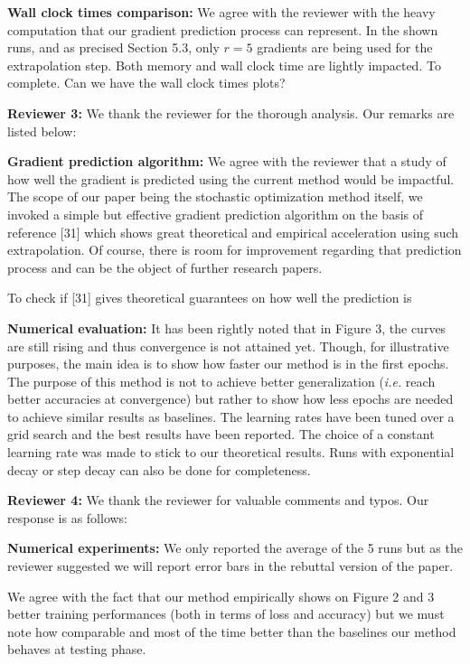 \documentclass{article}
\begin{document}
\textbf{Wall clock times comparison:}
We agree with the reviewer with the heavy computation that our gradient prediction process can represent.
In the shown runs, and as precised Section 5.3, only $r=5$ gradients are being used for the extrapolation step.
Both memory and wall clock time are lightly impacted.
{\color{red}  To complete. Can we have the wall clock times plots?}


\textbf{\textcolor{green!50!black}{Reviewer 3:}} We thank the reviewer for the thorough analysis. Our remarks are listed below:

\textbf{Gradient prediction algorithm:}
We agree with the reviewer that a study of how well the gradient is predicted using the current method would be impactful.
The scope of our paper being the stochastic optimization method itself, we invoked a simple but effective gradient prediction algorithm on the basis of reference [31] which shows great theoretical and empirical acceleration using such extrapolation.
Of course, there is room for improvement regarding that prediction process and can be the object of further research papers.

{\color{red}  To check if [31] gives theoretical guarantees on how well the prediction is}

\textbf{Numerical evaluation:} It has been rightly noted that in Figure 3, the curves are still rising and thus convergence is not attained yet.
Though, for illustrative purposes, the main idea is to show how faster our method is in the first epochs.
The purpose of this method is not to achieve better generalization (\textit{i.e.} reach better accuracies at convergence) but rather to show how less epochs are needed to achieve similar results as baselines.
The learning rates have been tuned over a grid search and the best results have been reported. The choice of a constant learning rate was made to stick to our theoretical results.
Runs with exponential decay or step decay can also be done for completeness.


\textbf{\textcolor{yellow!50!black}{Reviewer 4:}} We thank the reviewer for valuable comments and typos. Our response is as follows:

\textbf{Numerical experiments:}
We only reported the average of the 5 runs but as the reviewer suggested we will report error bars in the rebuttal version of the paper.

We agree with the fact that our method empirically shows on Figure 2 and 3 better training performances (both in terms of loss and accuracy) but we must note how comparable and most of the time better than the baselines our method behaves at testing phase.
\end{document}
